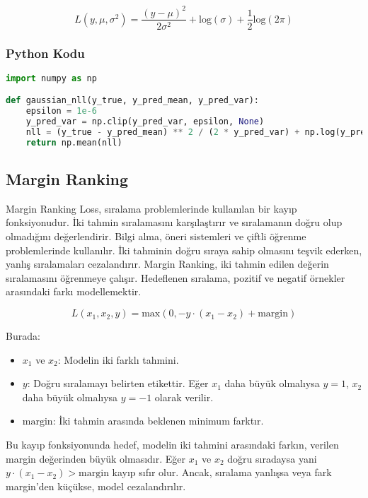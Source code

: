 \[ L(y, \mu, \sigma^2) = \frac{(y - \mu)^2}{2 \sigma^2} + \text{log}(\sigma) + \frac{1}{2} \text{log}(2 \pi)\]

\subsubsection{Python Kodu}

\begin{lstlisting}[language=Python]
import numpy as np

def gaussian_nll(y_true, y_pred_mean, y_pred_var):
    epsilon = 1e-6
    y_pred_var = np.clip(y_pred_var, epsilon, None)
    nll = (y_true - y_pred_mean) ** 2 / (2 * y_pred_var) + np.log(y_pred_var) + 0.5 * np.log(2 * np.pi)
    return np.mean(nll)
\end{lstlisting}

\newpage

\subsection{Margin Ranking}

Margin Ranking Loss, sıralama problemlerinde kullanılan bir kayıp fonksiyonudur. İki tahmin sıralamasını karşılaştırır ve sıralamanın doğru olup olmadığını değerlendirir. Bilgi alma, öneri sistemleri ve çiftli öğrenme problemlerinde kullanılır. İki tahminin doğru sıraya sahip olmasını teşvik ederken, yanlış sıralamaları cezalandırır. Margin Ranking, iki tahmin edilen değerin sıralamasını öğrenmeye çalışır. Hedeflenen sıralama, pozitif ve negatif örnekler arasındaki farkı modellemektir.

\[ L(x_1, x_2, y) = \text{max}(0, -y \cdot (x_1 - x_2) + \text{margin}) \]

Burada:

\begin{itemize}
    \item $x_1$ ve $x_2$: Modelin iki farklı tahmini.
    \item $y$: Doğru sıralamayı belirten etikettir. Eğer $x_1$ daha büyük olmalıysa $y = 1$, $x_2$ daha büyük olmalıysa $y = -1$ olarak verilir.
    \item $\text{margin}$: İki tahmin arasında beklenen minimum farktır.
\end{itemize}

Bu kayıp fonksiyonunda hedef, modelin iki tahmini arasındaki farkın, verilen margin değerinden büyük olmasıdır. Eğer $x_1$ ve $x_2$ doğru sıradaysa yani $y \cdot (x_1 - x_2) > \text{margin}$  kayıp sıfır olur. Ancak, sıralama yanlışsa veya fark margin’den küçükse, model cezalandırılır.

